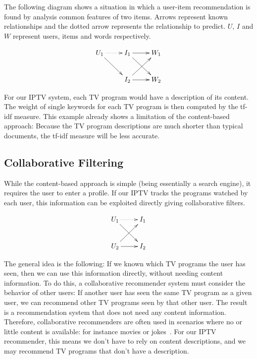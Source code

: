 \documentclass{article}
\begin{document}
The following diagram shows a situation in which a user-item
recommendation is found by analysis common features of two items. 
Arrows represent known relationships and the dotted arrow represents the
relationship to predict.  $U$, $I$ and $W$ represent users, items and
words respectively. 

\begin{displaymath}
  \xymatrix{ 
    U_1 \ar@{.>}[r] \ar[rd] & I_1 \ar[r] \ar[rd] & W_1 \\
    & I_2 \ar[ru] \ar[r]  & W_2
  }
\end{displaymath}


For our IPTV system, each TV program would have a description of
its content.  The weight of single keywords for each TV program is
then computed by the tf-idf measure.  
This example already shows a limitation of the content-based approach:
Because the TV program descriptions are much shorter than typical
documents, the tf-idf measure will be less accurate. 

\subsection{Collaborative Filtering}
While the content-based approach is simple (being essentially a search
engine), it requires the user to enter a profile.  If our IPTV
tracks the programs watched by each user, this information can be
exploited directly giving collaborative filters.   

\begin{displaymath}
  \xymatrix{
    U_1 \ar@{.>}[r] \ar[rd] & I_1 \\
    U_2 \ar[ru] \ar[r] & I_2 
  }
\end{displaymath}

The general idea is the following:  If we known which TV programs the user
has seen, then we can use this information directly, without needing content
information.  To do this, a collaborative recommender system must
consider the behavior of other users:  If another user has seen the same
TV program as a given user, we can recommend other TV programs seen by that
other user.  The result is a recommendation system that does not need
any content information.  Therefore, collaborative recommenders are
often used in scenarios where no or little content is available:  for
instance movies or jokes~\cite{b7}.  For our IPTV recommender,
this means we don't have to rely on content descriptions, and we may
recommend TV programs that don't have a description. 
\end{document}
